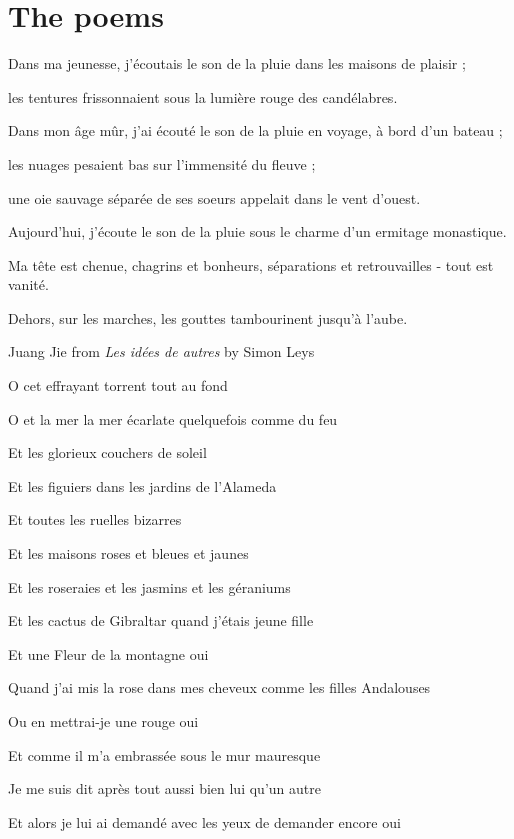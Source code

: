 \section{The poems}

Dans ma jeunesse, j'\'{e}coutais le son de la pluie dans les maisons de plaisir ;

les tentures frissonnaient sous la lumi\`{e}re rouge des cand\'{e}labres.

Dans mon \^{a}ge m\^{u}r, j'ai \'{e}cout\'{e} le son de la pluie
en voyage, \`{a} bord d'un bateau ;

les nuages pesaient bas sur l'immensit\'{e} du fleuve ;

une oie sauvage s\'{e}par\'{e}e de ses soeurs appelait dans le vent d'ouest.

Aujourd'hui, j'\'{e}coute le son de la pluie sous le charme d'un ermitage monastique.

Ma t\^{e}te est chenue, chagrins et bonheurs, s\'{e}parations et retrouvailles - tout est vanit\'{e}.

Dehors, sur les marches, les gouttes tambourinent jusqu'\`{a} l'aube.

\begin{flushleft}
Juang Jie from \textit{Les id\'{e}es de autres} by Simon Leys
\end{flushleft}

O cet effrayant torrent tout au fond

O et la mer la mer \'{e}carlate quelquefois comme du feu

Et les glorieux couchers de soleil

Et les figuiers dans les jardins de l'Alameda

Et toutes les ruelles bizarres

Et les maisons roses et bleues et jaunes

Et les roseraies et les jasmins et les g\'{e}raniums

Et les cactus de Gibraltar quand j'\'{e}tais jeune fille

Et une Fleur de la montagne oui

Quand j'ai mis la rose dans mes cheveux comme les filles Andalouses

Ou en mettrai-je une rouge oui

Et comme il m'a embrass\'{e}e sous le mur mauresque

Je me suis dit apr\`{e}s tout aussi bien lui qu'un autre

Et alors je lui ai demand\'{e} avec les yeux de demander encore
oui

